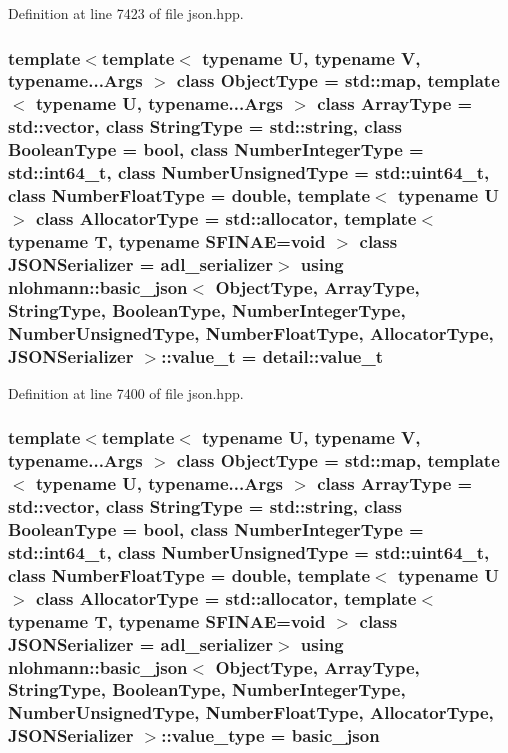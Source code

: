 Definition at line 7423 of file json.\+hpp.

\subsubsection[{\texorpdfstring{value\+\_\+t}{value_t}}]{\setlength{\rightskip}{0pt plus 5cm}template$<$template$<$ typename U, typename V, typename...\+Args $>$ class Object\+Type = std\+::map, template$<$ typename U, typename...\+Args $>$ class Array\+Type = std\+::vector, class String\+Type  = std\+::string, class Boolean\+Type  = bool, class Number\+Integer\+Type  = std\+::int64\+\_\+t, class Number\+Unsigned\+Type  = std\+::uint64\+\_\+t, class Number\+Float\+Type  = double, template$<$ typename U $>$ class Allocator\+Type = std\+::allocator, template$<$ typename T, typename S\+F\+I\+N\+A\+E=void $>$ class J\+S\+O\+N\+Serializer = adl\+\_\+serializer$>$ using {\bf nlohmann\+::basic\+\_\+json}$<$ Object\+Type, Array\+Type, String\+Type, Boolean\+Type, Number\+Integer\+Type, Number\+Unsigned\+Type, Number\+Float\+Type, Allocator\+Type, J\+S\+O\+N\+Serializer $>$\+::{\bf value\+\_\+t} =  {\bf detail\+::value\+\_\+t}}\hypertarget{classnlohmann_1_1basic__json_ae8cbef097f7da18a781fc86587de6b90}{}\label{classnlohmann_1_1basic__json_ae8cbef097f7da18a781fc86587de6b90}


Definition at line 7400 of file json.\+hpp.

\subsubsection[{\texorpdfstring{value\+\_\+type}{value_type}}]{\setlength{\rightskip}{0pt plus 5cm}template$<$template$<$ typename U, typename V, typename...\+Args $>$ class Object\+Type = std\+::map, template$<$ typename U, typename...\+Args $>$ class Array\+Type = std\+::vector, class String\+Type  = std\+::string, class Boolean\+Type  = bool, class Number\+Integer\+Type  = std\+::int64\+\_\+t, class Number\+Unsigned\+Type  = std\+::uint64\+\_\+t, class Number\+Float\+Type  = double, template$<$ typename U $>$ class Allocator\+Type = std\+::allocator, template$<$ typename T, typename S\+F\+I\+N\+A\+E=void $>$ class J\+S\+O\+N\+Serializer = adl\+\_\+serializer$>$ using {\bf nlohmann\+::basic\+\_\+json}$<$ Object\+Type, Array\+Type, String\+Type, Boolean\+Type, Number\+Integer\+Type, Number\+Unsigned\+Type, Number\+Float\+Type, Allocator\+Type, J\+S\+O\+N\+Serializer $>$\+::{\bf value\+\_\+type} =  {\bf basic\+\_\+json}}\hypertarget{classnlohmann_1_1basic__json_a2b3297873b70c080837e8eedc4fec32f}{}\label{classnlohmann_1_1basic__json_a2b3297873b70c080837e8eedc4fec32f}


